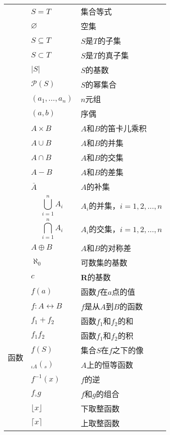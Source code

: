 \documentclass[UTF8]{ctexart}
\begin{document}
\begin{longtable}{|p{9em}|p{15em}|p{15em}|}
  \cline{2-3}
    & $S=T$ & 集合等式\\
  \cline{2-3}
    & $\varnothing$ & 空集\\
  \cline{2-3}
    & $S\subseteq T$ & $S$是$T$的子集\\
  \cline{2-3}
    & $S\subset T$ & $S$是$T$的真子集\\
  \cline{2-3}
    & $|S|$ & $S$的基数\\
  \cline{2-3}
    & $\mathcal{P}(S)$ & $S$的幂集合\\
  \cline{2-3}
    & $(a_1, ... , a_n)$ & $n$元组\\
  \cline{2-3}
    & $(a, b)$ & 序偶\\
  \cline{2-3}
    & $A\times B$ & $A$和$B$的笛卡儿乘积\\
  \cline{2-3}
    & $A\cup B$ & $A$和$B$的并集\\
  \cline{2-3}
    & $A\cap B$ & $A$和$B$的交集\\
  \cline{2-3}
    & $A-B$ & $A$和$B$的差集\\
  \cline{2-3}
    & $\bar{A}$ & $A$的补集\\
  \cline{2-3}
    & $$\bigcup_{i=1}^nA_i$$ & $A_i$的并集，$i=1, 2, ... , n$\\
  \cline{2-3}
    & $$\bigcap_{i=1}^nA_i$$ & $A_i$的交集，$i=1, 2, ... , n$\\
  \cline{2-3}
    & $A\oplus B$ & $A$和$B$的对称差\\
  \cline{2-3}
    & $\aleph_0$ & 可数集的基数\\
  \cline{2-3}
    & $c$ & $\mathbf{R}$的基数\\
  \hline
  \multirow{22}{9em}{函数} & $f(a)$ & 函数$f$在$a$点的值\\
  \cline{2-3}
    & $f:A\leftrightarrow B$ & $f$是从$A$到$B$的函数\\
  \cline{2-3}
    & $f_1+f_2$ & 函数$f_1$和$f_2$的和\\
  \cline{2-3}
    & $f_1f_2$ & 函数$f_1$和$f_2$的积\\
  \cline{2-3}
    & $f(S)$ & 集合$S$在$f$之下的像\\
  \cline{2-3}
    & $_{\iota A}(_s)$ & $A$上的恒等函数\\
  \cline{2-3}
    & $f^{-1}(x)$ & $f$的逆\\
  \cline{2-3}
    & $f_\circ g$ & $f$和$g$的组合\\
  \cline{2-3}
    & $\lfloor x\rfloor$ & 下取整函数\\
  \cline{2-3}
    & $\lceil x\rceil$ & 上取整函数\\
  \cline{2-3}

\end{longtable}
\end{document}
